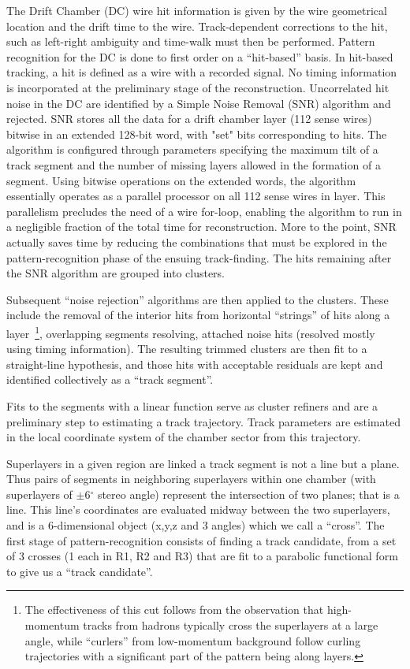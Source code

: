 \documentclass{elsart}
\begin{document}
The Drift Chamber (DC) wire hit information is given by the wire geometrical location and the drift time
to the wire. Track-dependent corrections to the hit, such as left-right ambiguity and time-walk must then
be performed. Pattern recognition for the DC is done to first order on a ``hit-based'' basis. In hit-based
tracking, a hit is defined as a wire with a recorded signal.  No timing information is incorporated at the
preliminary stage of the reconstruction.  Uncorrelated hit noise in the DC are identified by a Simple Noise
Removal (SNR) algorithm and rejected. SNR stores all the data for a drift chamber layer (112 sense wires)
bitwise in an extended 128-bit word, with "set" bits corresponding to hits. The algorithm is configured
through parameters specifying the maximum tilt of a track segment and the number of missing layers
allowed in the formation of a segment. Using bitwise operations on the extended words, the algorithm
essentially operates as a parallel processor on all 112 sense wires in layer. This parallelism precludes the
need of a wire for-loop, enabling the algorithm to run in a negligible fraction of the total time for
reconstruction. More to the point, SNR actually saves time by reducing the combinations that must be
explored in the pattern-recognition phase of the ensuing track-finding. The hits remaining after the SNR
algorithm are grouped into clusters. 

Subsequent ``noise rejection'' algorithms are then applied to the clusters. These include the removal of the
interior hits from horizontal ``strings'' of hits along a layer~\footnote{The effectiveness of this cut follows
  from the observation that high-momentum tracks from hadrons typically cross the superlayers at a large angle,
  while ``curlers'' from low-momentum background follow curling trajectories with a significant part of the
  pattern being along layers.}, overlapping segments resolving, attached noise hits (resolved mostly using timing
information). The resulting trimmed clusters are then fit to a straight-line hypothesis, and those hits with
acceptable residuals are kept and identified collectively as a ``track segment''. 

Fits to the segments with a linear function serve as cluster refiners and are a preliminary step to estimating
a track trajectory. Track parameters are estimated in the local coordinate system of the chamber sector from
this trajectory.

Superlayers in a given region are linked a track segment is not a line but a plane.  Thus pairs of segments in
neighboring superlayers within one chamber (with superlayers of $\pm$6$^\circ$ stereo angle) represent the
intersection of two planes; that is a line.  This line's coordinates are evaluated midway between the two
superlayers, and is a 6-dimensional object (x,y,z and 3 angles) which we call a ``cross''. The first stage of
pattern-recognition consists of finding a track candidate, from a set of 3 crosses (1 each in R1, R2 and R3) that
are fit to a parabolic functional form to give us a ``track candidate''.
\end{document}

